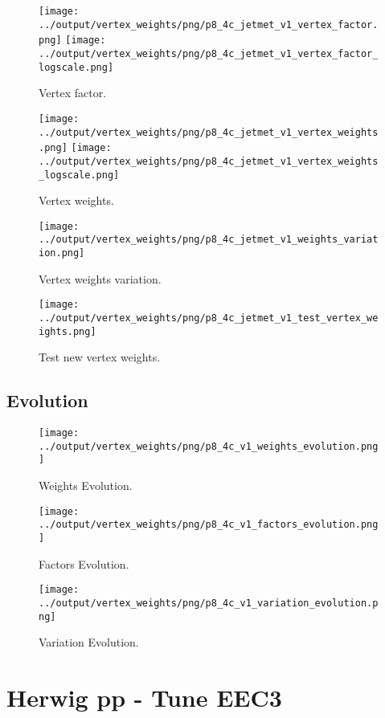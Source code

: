 \documentclass[11pt]{book}
\begin{document}
\begin{figure}[ht]
\centering
\texttt{[image: ../output/vertex\_weights/png/p8\_4c\_jetmet\_v1\_vertex\_factor.png]}
\texttt{[image: ../output/vertex\_weights/png/p8\_4c\_jetmet\_v1\_vertex\_factor\_logscale.png]}
\caption{Vertex factor.}
\end{figure}

\begin{figure}[ht]
\centering
\texttt{[image: ../output/vertex\_weights/png/p8\_4c\_jetmet\_v1\_vertex\_weights.png]}
\texttt{[image: ../output/vertex\_weights/png/p8\_4c\_jetmet\_v1\_vertex\_weights\_logscale.png]}
\caption{Vertex weights.}
\end{figure}

\begin{figure}[ht]
\centering
\texttt{[image: ../output/vertex\_weights/png/p8\_4c\_jetmet\_v1\_weights\_variation.png]}
\caption{Vertex weights variation.}
\end{figure}

\begin{figure}[ht]
\centering
\texttt{[image: ../output/vertex\_weights/png/p8\_4c\_jetmet\_v1\_test\_vertex\_weights.png]}
\caption{Test new vertex weights.}
\end{figure}
\clearpage

\subsection{Evolution}
\begin{figure}[ht]
\centering
\texttt{[image: ../output/vertex\_weights/png/p8\_4c\_v1\_weights\_evolution.png]}
\caption{Weights Evolution.}
\end{figure}


\begin{figure}[ht]
\centering
\texttt{[image: ../output/vertex\_weights/png/p8\_4c\_v1\_factors\_evolution.png]}
\caption{Factors Evolution.}
\end{figure}

\begin{figure}[ht]
\centering
\texttt{[image: ../output/vertex\_weights/png/p8\_4c\_v1\_variation\_evolution.png]}
\caption{Variation Evolution.}
\end{figure}
\clearpage


\section{Herwig pp - Tune EEC3}
\end{document}
